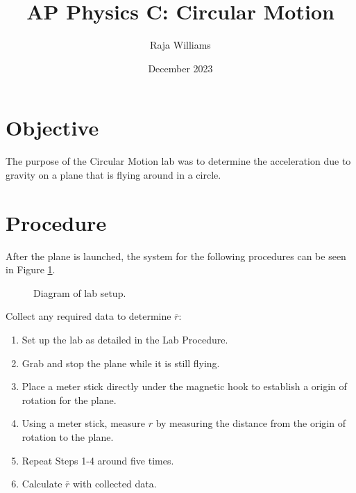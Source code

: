 \documentclass[12pt]{article}
\begin{document}
\title{AP Physics C: Circular Motion}
\author{Raja Williams}
\date{December 2023}
\maketitle

\section{Objective}
The purpose of the Circular Motion lab was to determine the acceleration due to
gravity on a plane that is flying around in a circle.

\section{Procedure}

After the plane is launched, the system for the following procedures can be seen
in Figure \ref{fig:overview}.

\begin{figure}[h]
    \centering
    \caption{Diagram of lab setup.}
    \label{fig:overview}
\end{figure}

Collect any required data to determine $\overline{r}$:
\begin{enumerate}
    \item Set up the lab as detailed in the Lab Procedure.
    \item Grab and stop the plane while it is still flying.
    \item Place a meter stick directly under the magnetic hook to establish a
        origin of rotation for the plane.
    \item Using a meter stick, measure $r$ by measuring the distance from the
        origin of rotation to the plane.
    \item Repeat Steps 1-4 around five times.
    \item Calculate $\overline{r}$ with collected data.
\end{enumerate}
\end{document}
